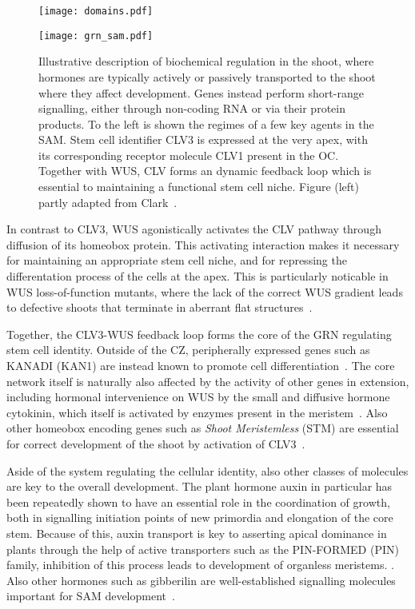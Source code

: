 \begin{figure}[H]
  \centering
  \begin{minipage}{0.55\textwidth}
    \centering
    \texttt{[image: domains.pdf]}
  \end{minipage}\hfill
  \begin{minipage}{0.45\textwidth}
    \centering
    \texttt{[image: grn\_sam.pdf]} 
  \end{minipage}
  \caption[Regulation of apical stem cells]{Illustrative description of
    biochemical regulation in the shoot, where hormones are typically actively or
    passively transported to the shoot where they affect development. Genes
    instead perform short-range signalling, either through non-coding RNA or
    via their protein products. To the left is shown the regimes of a few
    key agents in the SAM. Stem cell identifier CLV3 is expressed at the
    very apex, with its corresponding receptor molecule CLV1 present in the
    OC. Together with WUS, CLV forms an dynamic feedback loop which is
    essential to maintaining a functional stem cell niche. Figure (left) partly
    adapted from Clark~\cite{clark2001cell}.}
  \label{fig:sam_grn}
\end{figure}

In contrast to CLV3, WUS agonistically  
activates the CLV pathway through diffusion of its homeobox protein. This activating
interaction makes it necessary for maintaining an appropriate stem
cell niche, and for repressing the differentation process of the cells at the
apex. This is particularly noticable in WUS loss-of-function mutants, where the
lack of the correct WUS gradient leads to defective shoots that terminate in
aberrant flat structures~\cite{laux1996wuschel}.

Together, the CLV3-WUS feedback loop forms the core of the GRN regulating stem
cell identity. Outside of the CZ, peripherally expressed genes such as KANADI
(KAN1) are instead known to promote cell
differentiation~\cite{kerstetter2001kanadi}. The core network
itself is naturally  
also affected by the activity of other genes in extension, including hormonal
intervenience on WUS by the small and diffusive hormone cytokinin, which itself
is activated by enzymes present in the meristem~\cite{hutchison2002cytokinin}.
Also other homeobox encoding genes such as \textit{Shoot Meristemless} (STM) are
essential for correct development of the shoot by activation of
CLV3~\cite{scofield2013arabidopsis}.

Aside of the system regulating the cellular identity, also other classes of
molecules  are key to the overall development.  
The plant hormone auxin in particular has been repeatedly shown to have an
essential role in the coordination of growth, both in 
signalling initiation points of new primordia and elongation of the core stem.
Because of this, auxin transport is key to asserting apical dominance in plants
through the help of active transporters such as the PIN-FORMED (PIN) family,
inhibition of this process leads to development of organless meristems.
\cite{kvrevcek2009pin}. Also other hormones such as gibberilin are well-established
signalling molecules important for SAM
development~\cite{debeaujon2000gibberellin}.

